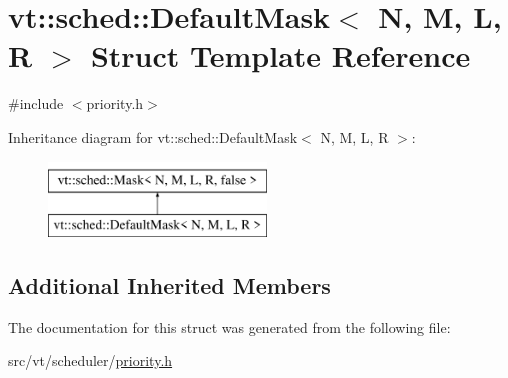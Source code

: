 \hypertarget{structvt_1_1sched_1_1_default_mask}{}\section{vt\+:\+:sched\+:\+:Default\+Mask$<$ N, M, L, R $>$ Struct Template Reference}
\label{structvt_1_1sched_1_1_default_mask}


{\ttfamily \#include $<$priority.\+h$>$}

Inheritance diagram for vt\+:\+:sched\+:\+:Default\+Mask$<$ N, M, L, R $>$\+:\begin{figure}[H]
\begin{center}
\leavevmode
\includegraphics[height=2.000000cm]{structvt_1_1sched_1_1_default_mask}
\end{center}
\end{figure}
\subsection*{Additional Inherited Members}


The documentation for this struct was generated from the following file\+:\begin{DoxyCompactItemize}
\item 
src/vt/scheduler/\hyperlink{priority_8h}{priority.\+h}\end{DoxyCompactItemize}
